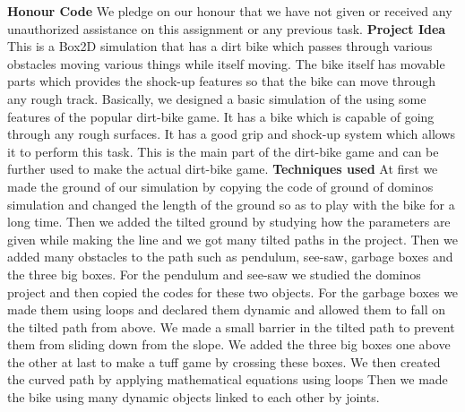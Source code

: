 \documentclass[17pt, a4paper]{extarticle}
\begin{document}
\color{red}
\textbf{Honour Code}\newline
\newline
\color{black}
We pledge on our honour that we have not given or received any unauthorized assistance on this assignment or any previous task.\newline \newline
\color{red} 
\textbf{Project Idea}
\color{black}
\newline \newline
This is a Box2D simulation that has  a dirt bike which passes through various obstacles moving various things while itself moving.
The bike itself has movable parts which provides the shock-up features so that the bike can move through any rough track.
Basically, we designed a basic simulation of the using some features  of the popular dirt-bike game. It has a bike which is capable of going through any rough surfaces. It has a good grip and shock-up system which allows it to perform this task. This is the main part of the dirt-bike game and can be further used to make the actual dirt-bike game.
\newpage
\color{red} 
\textbf{Techniques used}\newline
\newline
\color{black}
At first we made the ground of our simulation by copying the code of ground of dominos simulation and changed the length of the ground so as to play with the bike for a long time.
\newline
Then we added the tilted ground by studying how the parameters are given while making the line and we got many tilted paths in the project.
\newline
Then we added many obstacles to the path such as pendulum, see-saw, garbage boxes and the three big boxes.
\newline
For the pendulum and see-saw we studied the dominos project and then copied the codes for these two objects.
\newline
For the garbage boxes we made them using loops and declared them dynamic and allowed them to fall on the tilted path from above. We made a small barrier in the tilted path to prevent them from sliding down from the slope.
\newline
We added the three big boxes one above the other at last to make a tuff game by crossing these boxes.
\newline
We then created the curved path by applying mathematical equations using loops
\newline
Then we made the bike using many dynamic objects linked to each other by joints.
\end{document}
